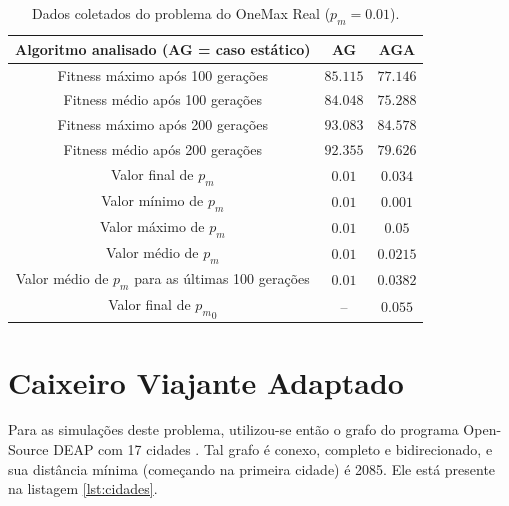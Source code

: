 \begin{table}
\caption{Dados coletados do problema do OneMax Real ($p_m = 0.01$).}
\label{tab:onemax_real}

\center
\begin{tabular}{|c|cc|}
	\hline
	Algoritmo analisado (AG = caso estático) 			& AG		& AGA		\\
	\hline
	Fitness máximo após 100 gerações					& $85.115$	& $77.146$	\\
	Fitness médio após 100 gerações						& $84.048$	& $75.288$	\\
	Fitness máximo após 200 gerações 					& $93.083$	& $84.578$	\\
	Fitness médio após 200 gerações 					& $92.355$	& $79.626$	\\
	Valor final de $p_m$								& $0.01$ 	& $0.034$	\\
	Valor mínimo de $p_m$								& $0.01$	& $0.001$	\\
	Valor máximo de $p_m$								& $0.01$	& $0.05$	\\
	Valor médio de $p_m$								& $0.01$	& $0.0215$	\\
	Valor médio de $p_m$ para as últimas 100 gerações	& $0.01$	& $0.0382$	\\
	Valor final de ${p_m}_0$								& --		& $0.055$	\\
	\hline
\end{tabular}
\end{table}

\section{Caixeiro Viajante Adaptado}

Para as simulações deste problema, utilizou-se então o grafo do programa Open-Source DEAP com 17 cidades \cite{DEAP_JMLR2012, deap2016tsp}. Tal grafo é conexo, completo e bidirecionado, e sua distância mínima (começando na primeira cidade) é 2085. Ele está presente na listagem \ref{lst:cidades}.

